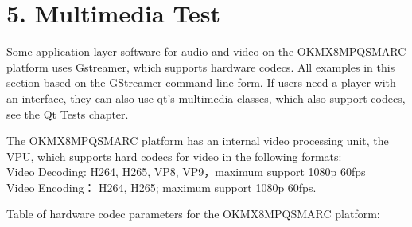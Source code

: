 \documentclass[letterpaper,10pt,openany,english]{sphinxmanual}
\begin{document}
\chapter{5. Multimedia Test}
\label{\detokenize{linux-manual:multimedia-test}}
\sphinxAtStartPar
Some application layer software for audio and video on the OK\sphinxhyphen{}MX8MPQ\sphinxhyphen{}SMARC platform uses Gstreamer, which supports hardware codecs. All examples in this section based on the GStreamer command line form. If users need a player with an interface, they can also use qt’s multimedia classes, which also support codecs, see the Qt Tests chapter.

\sphinxAtStartPar
The OK\sphinxhyphen{}MX8MPQ\sphinxhyphen{}SMARC platform has an internal video processing unit, the VPU, which supports hard codecs for video in the following formats:\\
Video Decoding: H264, H265, VP8, VP9，maximum support 1080p 60fps\\
Video Encoding： H264, H265; maximum support 1080p 60fps.

\sphinxAtStartPar
Table of hardware codec parameters for the OK\sphinxhyphen{}MX8MPQ\sphinxhyphen{}SMARC platform:
\end{document}
